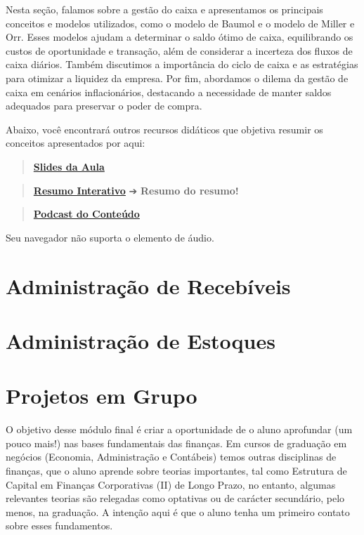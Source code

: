 \documentclass[
  a4paper,
]{book}
\begin{document}

Nesta seção, falamos sobre a gestão do caixa e apresentamos os
principais conceitos e modelos utilizados, como o modelo de Baumol e o
modelo de Miller e Orr. Esses modelos ajudam a determinar o saldo ótimo
de caixa, equilibrando os custos de oportunidade e transação, além de
considerar a incerteza dos fluxos de caixa diários. Também discutimos a
importância do ciclo de caixa e as estratégias para otimizar a liquidez
da empresa. Por fim, abordamos o dilema da gestão de caixa em cenários
inflacionários, destacando a necessidade de manter saldos adequados para
preservar o poder de compra.

Abaixo, você encontrará outros recursos didáticos que objetiva resumir
os conceitos apresentados por aqui:

\begin{quote}
\href{./resources/caixa-ppt.html}{\textbf{Slides da Aula}}
\end{quote}

\begin{quote}
\href{./resources/caixa-interativo.html}{\textbf{Resumo Interativo}} ➔
\textbf{Resumo do resumo!} 🥱
\end{quote}

\begin{quote}
\href{resources/caixa-podcast.mp3}{\textbf{Podcast do Conteúdo}}
\end{quote}

Seu navegador não suporta o elemento de áudio.


\chapter{Administração de Recebíveis}\label{sec-credito}


\chapter{Administração de Estoques}\label{sec-estoque}


\chapter{Projetos em Grupo}\label{sec-aval}

O objetivo desse módulo final é criar a oportunidade de o aluno
aprofundar (um pouco mais!) nas bases fundamentais das finanças. Em
cursos de graduação em negócios (Economia, Administração e Contábeis)
temos outras disciplinas de finanças, que o aluno aprende sobre teorias
importantes, tal como Estrutura de Capital em Finanças Corporativas (II)
de Longo Prazo, no entanto, algumas relevantes teorias são relegadas
como optativas ou de carácter secundário, pelo menos, na graduação. A
intenção aqui é que o aluno tenha um primeiro contato sobre esses
fundamentos.
\end{document}
